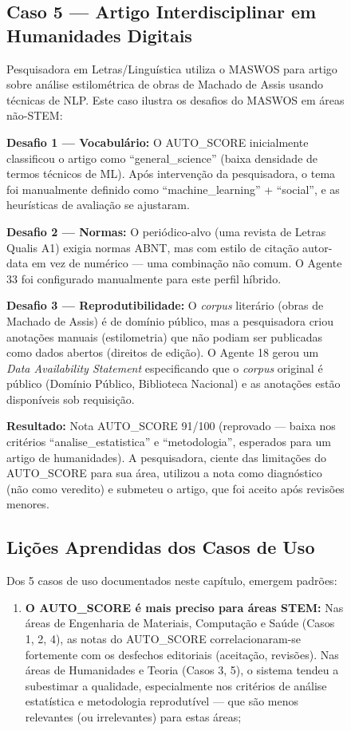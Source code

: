 \begin{figure}
\subsection{Caso 5 — Artigo Interdisciplinar em Humanidades Digitais}
\label{sec:caso5}

Pesquisadora em Letras/Linguística utiliza o MASWOS para artigo
sobre análise estilométrica de obras de Machado de Assis usando
técnicas de NLP. Este caso ilustra os desafios do MASWOS em áreas
não-STEM:

\textbf{Desafio 1 — Vocabulário:} O AUTO\_SCORE inicialmente
classificou o artigo como ``general\_science'' (baixa densidade de
termos técnicos de ML). Após intervenção da pesquisadora, o tema
foi manualmente definido como ``machine\_learning'' + ``social'', e
as heurísticas de avaliação se ajustaram.

\textbf{Desafio 2 — Normas:} O periódico-alvo (uma revista de
Letras Qualis A1) exigia normas ABNT, mas com estilo de citação
autor-data em vez de numérico — uma combinação não comum. O Agente
33 foi configurado manualmente para este perfil híbrido.

\textbf{Desafio 3 — Reprodutibilidade:} O \textit{corpus} literário
(obras de Machado de Assis) é de domínio público, mas a
pesquisadora criou anotações manuais (estilometria) que não podiam
ser publicadas como dados abertos (direitos de edição). O Agente 18
gerou um \textit{Data Availability Statement} especificando que o
\textit{corpus} original é público (Domínio Público, Biblioteca
Nacional) e as anotações estão disponíveis sob requisição.

\textbf{Resultado:} Nota AUTO\_SCORE 91/100 (reprovado — baixa nos
critérios ``analise\_estatistica'' e ``metodologia'', esperados
para um artigo de humanidades). A pesquisadora, ciente das
limitações do AUTO\_SCORE para sua área, utilizou a nota como
diagnóstico (não como veredito) e submeteu o artigo, que foi aceito
após revisões menores.

\subsection{Lições Aprendidas dos Casos de Uso}
\label{sec:licoes_casos}

Dos 5 casos de uso documentados neste capítulo, emergem padrões:

\begin{enumerate}
    \item \textbf{O AUTO\_SCORE é mais preciso para áreas STEM:}
    Nas áreas de Engenharia de Materiais, Computação e Saúde
    (Casos 1, 2, 4), as notas do AUTO\_SCORE correlacionaram-se
    fortemente com os desfechos editoriais (aceitação, revisões).
    Nas áreas de Humanidades e Teoria (Casos 3, 5), o sistema
    tendeu a subestimar a qualidade, especialmente nos critérios
    de análise estatística e metodologia reprodutível — que são
    menos relevantes (ou irrelevantes) para estas áreas;


\end{enumerate}
\end{figure}
